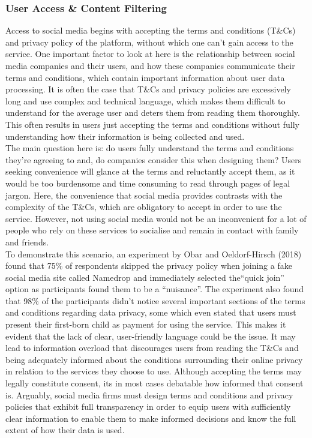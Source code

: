 \documentclass[11pt, english]{article}
\begin{document}
		\subsubsection{User Access \& Content Filtering}

	Access to social media begins with accepting the terms and conditions (T\&Cs) and privacy policy of the platform, without which one can't gain access to the service. One important factor to look at here is the relationship between social media companies and their users, and how these companies communicate their terms and conditions, which contain important information about user data processing. It is often the case that T\&Cs and privacy policies are excessively long and use complex and technical language, which makes them difficult to understand for the average user and deters them from reading them thoroughly. This often results in users just accepting the terms and conditions without fully understanding how their information is being collected and used.\\

	The main question here is: do users fully understand the terms and conditions they're agreeing to and, do companies consider this when designing them? Users seeking convenience will glance at the terms and reluctantly accept them, as it would be too burdensome and time consuming to read through pages of legal jargon. Here, the convenience that social media provides contrasts with the complexity of the T\&Cs, which are obligatory to accept in order to use the service. However, not using social media would not be an inconvenient for a lot of people who rely on these services to socialise and remain in contact with family and friends.\\

	To demonstrate this scenario, an experiment by Obar and Oeldorf-Hirsch (2018) found that 75\% of respondents skipped the privacy policy when joining a fake social media site called Namedrop and immediately selected the``quick join'' option as participants found them to be a ``nuisance''. The experiment also found that 98\% of the participants didn't notice several important sections of the terms and conditions regarding data privacy, some which even stated that users must present their first-born child as payment for using the service. This makes it evident that the lack of clear, user-friendly language could be the issue. It may lead to information overload that discourages users from reading the T\&Cs and being adequately informed about the conditions surrounding their online privacy in relation to the services they choose to use. Although accepting the terms may legally constitute consent, its in most cases debatable how informed that consent is. Arguably, social media firms must design terms and conditions and privacy policies that exhibit full transparency in order to equip users with sufficiently clear information to enable them to make informed decisions and know the full extent of how their data is used.
\end{document}
